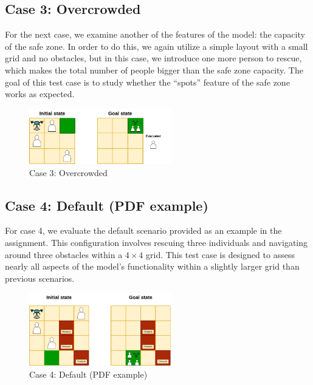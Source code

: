 \documentclass{article}
\begin{document}
\subsection{Case 3: Overcrowded}

For the next case, we examine another of the features of the model: the capacity of the safe zone. In order to do this, we again utilize a simple layout with a small grid and no obstacles, but in this case, we introduce one more person to rescue, which makes the total number of people bigger than the safe zone capacity. The goal of this test case is to study whether the “spots” feature of the safe zone works as expected.

\begin{figure}[ht]
    \centering
    \includegraphics[width=0.55\textwidth]{assets/problem-3-overcrowded.drawio.png}
    \caption{Case 3: Overcrowded}
    \label{fig:initial-state-overcrowded}
\end{figure}

\FloatBarrier

\subsection{Case 4: Default (PDF example)}

For case 4, we evaluate the default scenario provided as an example in the assignment. This configuration involves rescuing three individuals and navigating around three obstacles within a \(4 \times 4\) grid. This test case is designed to assess nearly all aspects of the model's functionality within a slightly larger grid than previous scenarios.

\begin{figure}[ht]
    \centering
    \includegraphics[width=0.55\textwidth]{assets/problem-4-pdf-example.drawio.png}
    \caption{Case 4: Default (PDF example)}
    \label{fig:initial-state-default}
\end{figure}
\end{document}

